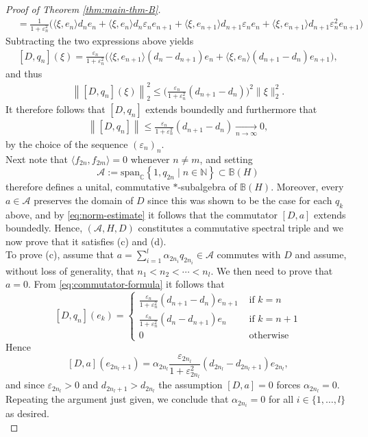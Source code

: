 \documentclass[12pt,a4paper,twoside,reqno]{amsart}
\theoremstyle{plain}
\theoremstyle{definition}
\theoremstyle{remark} %
\theoremstyle{plain}
\numberwithin{equation}{section}
\newcommand{\varps}{{\varepsilon}}
\renewcommand{\leq}{\leqslant}
\newcommand{\inn}[1]{\langle #1 \rangle}
\newcommand{\A}{{\mathcal{A}}}
\newcommand{\BB}{{\mathbb{B}}}
\newcommand{\CC}{{\mathbb{C}}}
\newcommand{\NN}{{\mathbb{N}}}
\begin{document}
\begin{proof}[Proof of Theorem \ref{thm:main-thm-B}]
\begin{align*}
&= \frac{1}{1+ \varps_n^2}\Big(\inn{\xi,e_n}d_ne_n +\inn{\xi, e_n}d_n\varps_ne_{n+1} +\inn{\xi, e_{n+1}}d_{n+1}\varps_n e_n +\inn{\xi, e_{n+1}}d_{n+1}\varps_n^2 e_{n+1} \Big)
\end{align*}
Subtracting the two expressions above yields
\begin{align}\label{eq:commutator-formula}
[D,q_n](\xi)=\frac{\varps_n}{1+\varps_n^2}\Big( \inn{\xi,e_{n+1}}(d_n-d_{n+1})e_n + \inn{\xi, e_n}(d_{n+1}-d_n)e_{n+1} \Big),
\end{align}
and thus
\begin{align*}
\left\|[D,q_n](\xi)\right\|_2^2 \leq \Big( \frac{\varps_n}{1+\varps_n^2} (d_{n+1}-d_n)\Big)^2\|\xi\|_2^2.
\end{align*}
It therefore follows that $[D,q_n]$ extends boundedly and furthermore that 
\begin{align}\label{eq:norm-estimate}
\left\|[D,q_n] \right\| \leq  \frac{\varps_n}{1+\varps_n^2} (d_{n+1}-d_n) \underset{n\to \infty}{\longrightarrow} 0,
\end{align}
by the choice of the sequence $(\varps_n)_{n}$.\\
Next note that $\inn{f_{2n}, f_{2m}}=0$ whenever $n\neq m$, and setting
\[
\A:= \text{span}_{\CC} \left\{1, q_{2n} \mid n\in \NN\right\} \subset \BB(H)
\]
therefore defines a unital, commutative $*$-subalgebra of $\BB(H)$. Moreover, 
every  $a\in \A$ preserves the domain of $D$ since this was shown to be the case for each $q_{k}$ above, and by \eqref{eq:norm-estimate} it follows that the commutator $[D,a]$ extends boundedly. Hence, $(\A, H, D)$ constitutes a commutative spectral triple and we now  prove that it satisfies (c) and (d).\\


To prove (c), assume that $a=\sum_{i=1}^l \alpha_{2n_i} q_{2n_i}\in \A$ commutes with $D$ and assume, without loss of generality, that $n_1<n_2 <\cdots < n_l$. We then need to prove that $a=0$. From \eqref{eq:commutator-formula} it follows that
\[
[D,q_n](e_k)= 
\begin{cases}
  \frac{\varps_n}{1+\varps_n^2}(d_{n+1}-d_n)e_{n+1}   &  \text{ if } k=n \\
  \frac{\varps_n}{1+\varps_n^2}(d_{n}-d_{n+1})e_{n}  &  \text{ if } k= n+1 \\
  0  &  \text{ otherwise }
\end{cases}
\]
Hence
\[
[D, a](e_{2n_l+1})=\alpha_{2n_l}  \frac{\varps_{2n_l}}{1+\varps_{2n_l}^2}(d_{2n_l}-d_{2n_l+1})e_{2n_l}, 
\]
and since $\varps_{2n_l}>0$ and $d_{2n_l+1}> d_{2n_l}$ the assumption $[D,a]=0$ forces $\alpha_{2n_l}=0$.  Repeating the argument just given, we conclude that $\alpha_{2n_i}=0$ for all $i\in \{1,\dots, l\}$ as desired.\\



\end{proof}
\end{document}
